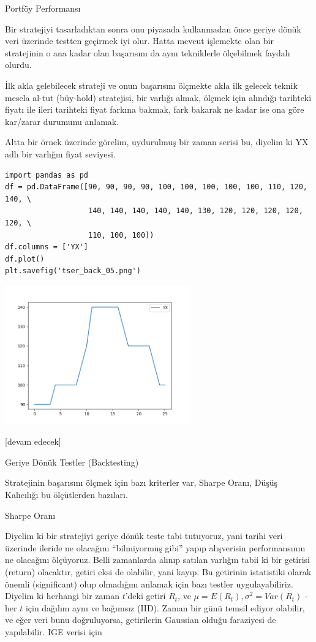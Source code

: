 \documentclass[12pt,fleqn]{article}\usepackage{../../common}
\begin{document}
Portföy Performansı

Bir stratejiyi tasarladıktan sonra onu piyasada kullanmadan önce geriye dönük
veri üzerinde testten geçirmek iyi olur. Hatta mevcut işlemekte olan bir
stratejinin o ana kadar olan başarısını da aynı tekniklerle ölçebilmek
faydalı olurdu.

İlk akla gelebilecek strateji ve onun başarısını ölçmekte akla ilk gelecek
teknik mesela al-tut (büy-hold) stratejisi, bir varlığı almak, ölçmek için
alındığı tarihteki fiyatı ile ileri tarihteki fiyat farkına bakmak, fark bakarak
ne kadar ise ona göre kar/zarar durumunu anlamak.

Altta bir örnek üzerinde görelim, uydurulmuş bir zaman serisi bu, diyelim ki
YX adlı bir varlığın fiyat seviyesi.

\begin{verbatim}
import pandas as pd
df = pd.DataFrame([90, 90, 90, 90, 100, 100, 100, 100, 100, 110, 120, 140, \
                   140, 140, 140, 140, 140, 130, 120, 120, 120, 120, 120, \
                   110, 100, 100])
df.columns = ['YX']
df.plot()
plt.savefig('tser_back_05.png')
\end{verbatim}

\includegraphics[height=6cm]{tser_back_05.png}





[devam edecek]

Geriye Dönük Testler (Backtesting)

Stratejinin başarısını ölçmek için bazı kriterler var, Sharpe Oranı, Düşüş
Kalıcılığı bu ölçütlerden bazıları.

Sharpe Oranı 

Diyelim ki bir stratejiyi geriye dönük teste tabi tutuyoruz, yani tarihi veri
üzerinde ileride ne olacağını ``bilmiyormuş gibi'' yapıp alışverisin
performansının ne olacağını ölçüyoruz. Belli zamanlarda alınıp satılan varlığın
tabii ki bir getirisi (return) olacaktır, getiri eksi de olabilir, yani
kayıp. Bu getirinin istatistiki olarak önemli (significant) olup olmadığını
anlamak için bazı testler uygulayabiliriz. Diyelim ki herhangi bir zaman
$t$'deki getiri $R_t$, ve $\mu = E(R_t), \sigma^2=Var(R_t)$ - her $t$ için
dağılım aynı ve bağımsız (IID). Zaman bir günü temsil ediyor olabilir, ve eğer
veri bunu doğruluyorsa, getirilerin Gaussian olduğu faraziyesi de
yapılabilir. IGE verisi için
\end{document}
